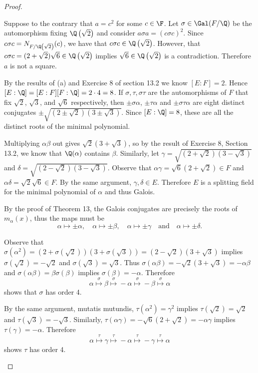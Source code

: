 \documentclass[10pt]{amsart}
\begin{document}
\begin{thm}
  \begin{proof}
    \begin{alphaenum}
    \item
      Suppose to the contrary that $a = c^2$ for some $c \in \F$.
      Let $\sigma \in \Gal(F/\Q)$ be the automorphism fixing $\Q\left(\sqrt{2}\right)$ and consider $a\sigma a = (c\sigma c)^2$.
      Since $c\sigma c = N_{F/\Q\left(\sqrt{2}\right)}(c)$, we have that $c\sigma c \in \Q\left(\sqrt{2}\right)$.
      However, that $c\sigma c = (2+\sqrt{2})\sqrt{6} \in \Q\left(\sqrt{2}\right)$ implies $\sqrt{6} \in \Q\left(\sqrt{2}\right)$ is a contradiction.
      Therefore $a$ is not a square.
    \item
      By the results of (a) and Exercise 8 of section 13.2 we know $[E:F] = 2$.
      Hence $[E:\Q] = [E:F][F:\Q] = 2\cdot 4 = 8$.
      If $\sigma, \tau, \sigma\tau$ are the automorphisms of $F$ that fix $\sqrt{2}$, $\sqrt{3}$, and $\sqrt{6}$ respectively, then $\pm\sigma\alpha$, $\pm\tau\alpha$ and $\pm\sigma\tau\alpha$ are eight distinct conjugates $\pm\sqrt{(2 \pm \sqrt{2})(3 \pm \sqrt{3})}$.
      Since $[E:\Q] = 8$, these are all the distinct roots of the minimal polynomial.
    \item
      Multiplying $\alpha\beta$ out gives $\sqrt{2}(3 + \sqrt{3})$, so by the result of Exercise 8, Section 13.2, we know that $\Q(\alpha)$ contains $\beta$.
      Similarly, let $\gamma = \sqrt{(2 + \sqrt{2})(3 - \sqrt{3})}$ and $\delta = \sqrt{(2 - \sqrt{2})(3 - \sqrt{3})}$.
      Observe that $\alpha\gamma = \sqrt{6}(2 + \sqrt{2})\in F$ and $\alpha\delta = \sqrt{2}\sqrt{6} \in F$.
      By the same argument, $\gamma,\delta \in E$.
      Therefore $E$ is a splitting field for the minimal polynomial of $\alpha$ and thus Galois.
      
      By the proof of Theorem 13, the Galois conjugates are precisely the roots of $m_\alpha(x)$, thus the maps must be 
      $$\alpha \mapsto \pm \alpha, \quad \alpha \mapsto \pm\beta, \quad \alpha \mapsto \pm \gamma \quad \text{and} \quad \alpha \mapsto \pm\delta.$$
    \item
      Observe that $\sigma(\alpha^2) = (2 + \sigma(\sqrt{2}))(3 + \sigma(\sqrt{3})) = (2 - \sqrt{2})(3 + \sqrt{3})$ implies $\sigma(\sqrt{2}) = - \sqrt{2}$ and $\sigma(\sqrt{3}) = \sqrt{3}$.
      Thus $\sigma(\alpha\beta) =  -\sqrt{2}(3 + \sqrt{3}) = -\alpha\beta$ and $\sigma(\alpha\beta)  = \beta\sigma(\beta)$ implies $\sigma(\beta) = -\alpha$.
      Therefore 
      $$\alpha \overset{\sigma}{\longmapsto} \beta \overset{\sigma}{\longmapsto} - \alpha \overset{\sigma}{\longmapsto} -\beta \overset{\sigma}{\longmapsto} \alpha$$
      shows that $\sigma$ has order 4.
    \item
      By the same argument, mutatis mutundis, $\tau(\alpha^2) = \gamma^2$ implies $\tau(\sqrt{2}) = \sqrt{2}$ and $\tau(\sqrt{3}) = -\sqrt{3}$.
      Similarly, $\tau(\alpha\gamma) = -\sqrt{6}(2+\sqrt{2}) = -\alpha\gamma$ implies $\tau(\gamma) = -\alpha$.
      Therefore $$\alpha \overset{\tau}{\longmapsto} \gamma \overset{\tau}{\longmapsto} -\alpha \overset{\tau}{\longmapsto} -\gamma \overset{\tau}{\longmapsto} \alpha$$
      shows $\tau$ has order 4.
      

\end{alphaenum}
\end{proof}
\end{thm}
\end{document}
